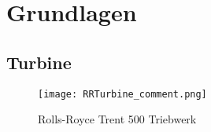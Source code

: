\chapter{Grundlagen}
\section{Turbine}

\begin{figure}[htbp]
	\centering
	\texttt{[image: RRTurbine\_comment.png]}
	\caption{Rolls-Royce Trent 500 Triebwerk \cite{RRFlickr}} \label{fig:RRTurbine}
\end{figure} 


